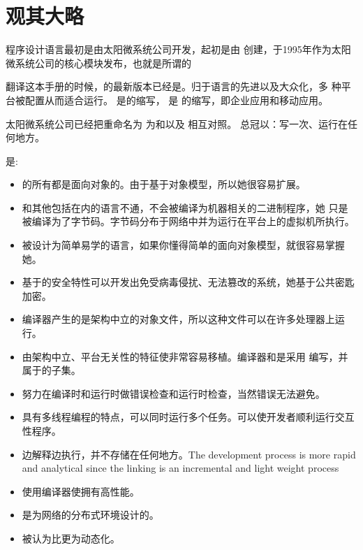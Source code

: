 \documentclass{article}
\begin{document}
\section{观其大略}
 程序设计语言最初是由太阳微系统公司开发，起初是由 创建，于1995年作为太阳
微系统公司的核心模块发布，也就是所谓的

翻译这本手册的时候，的最新版本已经是。归于语言的先进以及大众化，多
种平台被配置从而适合运行。 是的缩写， 是
的缩写，即企业应用和移动应用。

太阳微系统公司已经把重命名为 为和以及 相互对照。
总冠以：写一次、运行在任何地方。

是:

\begin{itemize}
\item {} 的所有都是面向对象的。由于基于对象模型，所以她很容易扩展。
\item {} 和其他包括在内的语言不通，不会被编译为机器相关的二进制程序，她
只是被编译为了字节码。字节码分布于网络中并为运行在平台上的虚拟机所执行。
\item {} 被设计为简单易学的语言，如果你懂得简单的面向对象模型，就很容易掌握她。
\item {} 基于的安全特性可以开发出免受病毒侵扰、无法篡改的系统，她基于公共密匙加密。
\item {} 编译器产生的是架构中立的对象文件，所以这种文件可以在许多处理器上运行。
\item {} 由架构中立、平台无关性的特征使非常容易移植。编译器和是采用
编写，并属于的子集。
\item {} 努力在编译时和运行时做错误检查和运行时检查，当然错误无法避免。
\item {}  具有多线程编程的特点，可以同时运行多个任务。可以使开发者顺利运行交互性程序。
\item {}  边解释边执行，并不存储在任何地方。{\textsf The development process is more rapid
and analytical since the linking is an incremental and light weight process}
\item {} 使用编译器使拥有高性能。
\item {} 是为网络的分布式环境设计的。
\item {}  被认为比更为动态化。
\end{itemize}
\end{document}
